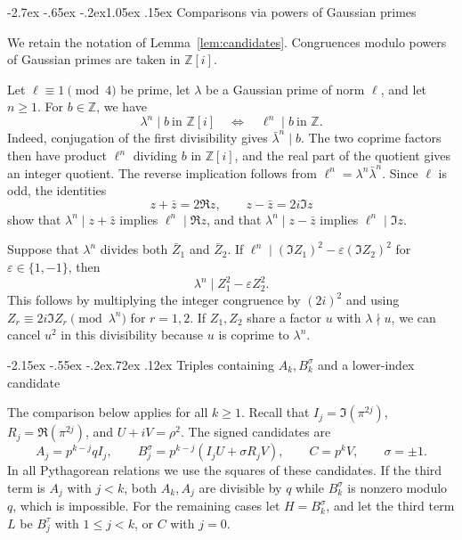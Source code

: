 \documentclass[11pt,a4paper,twoside]{article}
\makeatletter
\numberwithin{equation}{section}
\renewcommand{\section}{\@startsection{section}{1}{\z@}%
  {-2.7ex \@plus -.65ex \@minus -.2ex}{1.05ex \@plus .15ex}%
  {\normalfont\large\bfseries}}
\renewcommand{\subsection}{\@startsection{subsection}{2}{\z@}%
  {-2.15ex \@plus -.55ex \@minus -.2ex}{.72ex \@plus .12ex}%
  {\normalfont\normalsize\bfseries}}
\makeatother
\begin{document}
\section{Comparisons via powers of Gaussian primes}
\label{sec:gaussian-comparison}

We retain the notation of Lemma~\ref{lem:candidates}. Congruences modulo powers of Gaussian primes are taken in \(\mathbb Z[i]\).

Let \(\ell\equiv1\pmod 4\) be prime, let \(\lambda\) be a Gaussian prime of norm \(\ell\), and let \(n\ge1\). For \(b\in\mathbb Z\), we have
\[
\lambda^n\mid b\ \text{in }\mathbb Z[i]
\quad\Longleftrightarrow\quad
\ell^n\mid b\ \text{in }\mathbb Z.
\]
Indeed, conjugation of the first divisibility gives \(\bar\lambda^n\mid b\). The two coprime factors then have product \(\ell^n\) dividing \(b\) in \(\mathbb Z[i]\), and the real part of the quotient gives an integer quotient. The reverse implication follows from \(\ell^n=\lambda^n\bar\lambda^n\). Since \(\ell\) is odd, the identities
\[
z+\bar z=2\Re z,\qquad z-\bar z=2i\Im z
\]
show that \(\lambda^n\mid z+\bar z\) implies \(\ell^n\mid\Re z\), and that \(\lambda^n\mid z-\bar z\) implies \(\ell^n\mid\Im z\).

Suppose that \(\lambda^n\) divides both \(\bar Z_1\) and \(\bar Z_2\). If
\(\ell^n\mid(\Im Z_1)^2-\varepsilon(\Im Z_2)^2\) for \(\varepsilon\in\{1,-1\}\), then
\[
\lambda^n\mid Z_1^2-\varepsilon Z_2^2.
\]
This follows by multiplying the integer congruence by \((2i)^2\) and using \(Z_r\equiv2i\Im Z_r\pmod{\lambda^n}\) for \(r=1,2\). If \(Z_1,Z_2\) share a factor \(u\) with \(\lambda\nmid u\), we can cancel \(u^2\) in this divisibility because \(u\) is coprime to \(\lambda^n\).

\subsection{Triples containing \texorpdfstring{\(A_k,B_k^\sigma\)}{A(k), B(k, sigma)} and a lower-index candidate}
\label{subsec:gaussian-comparison}

The comparison below applies for all \(k\ge1\). Recall that \(I_j=\Im(\pi^{2j})\), \(R_j=\Re(\pi^{2j})\), and \(U+iV=\rho^2\). The signed candidates are
\[
A_j=p^{k-j}qI_j,\qquad B_j^\sigma=p^{k-j}(I_jU+\sigma R_jV),\qquad
C=p^kV,\qquad \sigma=\pm1.
\]
In all Pythagorean relations we use the squares of these candidates. If the third term is \(A_j\) with \(j<k\), both \(A_k,A_j\) are divisible by \(q\) while \(B_k^\sigma\) is nonzero modulo \(q\), which is impossible. For the remaining cases let \(H=B_k^\sigma\), and let the third term \(L\) be \(B_j^\tau\) with \(1\le j<k\), or \(C\) with \(j=0\).
\end{document}
